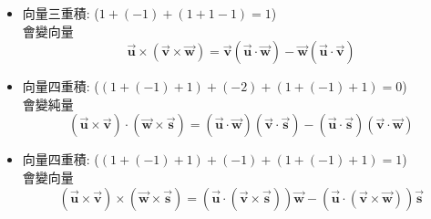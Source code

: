 \documentclass[../main.tex]{subfiles}
\begin{document}
\begin{itemize}
\begin{itemize}
    會變純量，照循環順序$u\to v\to w$不可相反
    \begin{equation}
      \vec {\bm u} \cdot (\vec {\bm v} \times \vec {\bm w}) = \vec {\bm v} \cdot (\vec {\bm w} \times \vec {\bm u}) = \vec {\bm w} \cdot (\vec {\bm u} \times \vec {\bm v})
    \end{equation}
    \item 向量三重積: ($1+ (-1) + (1+ 1 -1) =1$)\\
    會變向量
    \begin{equation}
      \vec {\bm u} \times (\vec {\bm v} \times \vec {\bm w}) = \vec {\bm v} (\vec {\bm u} \cdot \vec {\bm w}) - \vec {\bm w} (\vec {\bm u} \cdot \vec {\bm v})
    \end{equation}
    \item 向量四重積: ($(1+(-1)+1) + (-2) + (1+(-1)+1) = 0$)\\
    會變純量
    \begin{equation}
      (\vec {\bm u} \times \vec {\bm v}) \cdot (\vec {\bm w} \times \vec {\bm s}) = (\vec {\bm u} \cdot \vec {\bm w})(\vec {\bm v} \cdot \vec {\bm s}) - (\vec {\bm u} \cdot \vec {\bm s})(\vec {\bm v} \cdot \vec {\bm w})
    \end{equation}
    \item 向量四重積: ($(1+(-1)+1) + (-1) + (1+(-1)+1) = 1$)\\
    會變向量
    \begin{equation}
      (\vec {\bm u} \times \vec {\bm v}) \times (\vec {\bm w} \times \vec {\bm s}) = (\vec {\bm u} \cdot (\vec {\bm v} \times \vec {\bm s}))\vec {\bm w} - (\vec {\bm u} \cdot (\vec {\bm v} \times \vec {\bm w}))\vec {\bm s}
    \end{equation}
  \end{itemize}
\end{itemize}
\end{document}
